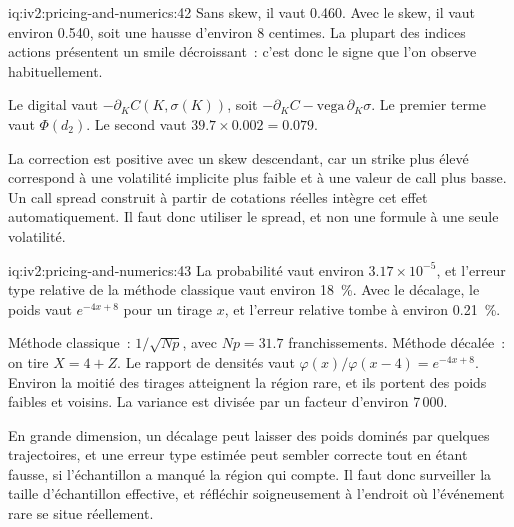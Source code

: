 \begin{solution}{iq:iv2:pricing-and-numerics:42}
Sans skew, il vaut 0.460. Avec le skew, il vaut environ 0.540, soit une hausse d'environ 8 centimes. La plupart des indices actions présentent un smile décroissant~: c'est donc le signe que l'on observe habituellement.

Le digital vaut $-\partial_KC(K, \sigma(K))$, soit $-\partial_KC - \text{vega}\,\partial_K\sigma$. Le premier terme vaut $\Phi(d_2)$. Le second vaut $39.7 \times 0.002 = 0.079$.

La correction est positive avec un skew descendant, car un strike plus élevé correspond à une volatilité implicite plus faible et à une valeur de call plus basse. Un call spread construit à partir de cotations réelles intègre cet effet automatiquement. Il faut donc utiliser le spread, et non une formule à une seule volatilité.

\end{solution}

\begin{solution}{iq:iv2:pricing-and-numerics:43}
La probabilité vaut environ $3.17 \times 10^{-5}$, et l'erreur type relative de la méthode classique vaut environ 18~\%. Avec le décalage, le poids vaut $e^{-4x + 8}$ pour un tirage $x$, et l'erreur relative tombe à environ 0.21~\%.

Méthode classique~: $1/\sqrt{Np}$, avec $Np = 31.7$ franchissements. Méthode décalée~: on tire $X = 4 + Z$. Le rapport de densités vaut $\varphi(x)/\varphi(x - 4) = e^{-4x + 8}$. Environ la moitié des tirages atteignent la région rare, et ils portent des poids faibles et voisins. La variance est divisée par un facteur d'environ 7\,000.

En grande dimension, un décalage peut laisser des poids dominés par quelques trajectoires, et une erreur type estimée peut sembler correcte tout en étant fausse, si l'échantillon a manqué la région qui compte. Il faut donc surveiller la taille d'échantillon effective, et réfléchir soigneusement à l'endroit où l'événement rare se situe réellement.

\end{solution}

